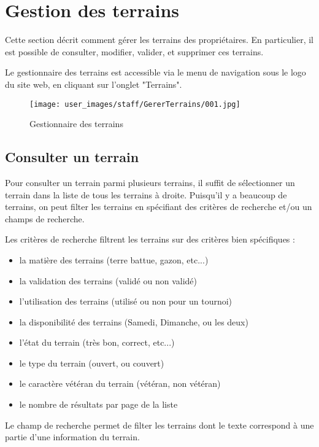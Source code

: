 \section{Gestion des terrains}

Cette section décrit comment gérer les terrains des propriétaires. En particulier, il est possible de consulter, modifier, valider, et supprimer ces terrains. \newline

Le gestionnaire des terrains est accessible via le menu de navigation sous le logo du site web, en cliquant sur l'onglet "Terrains".

\begin{figure}[H]
\centering
\texttt{[image: user\_images/staff/GererTerrains/001.jpg]}
\caption{Gestionnaire des terrains}
\end{figure}

\subsection{Consulter un terrain}

Pour consulter un terrain parmi plusieurs terrains, il suffit de sélectionner un terrain dans la liste de tous les terrains à droite. Puisqu'il y a beaucoup de terrains, on peut filter les terrains en spécifiant des critères de recherche et/ou un champs de recherche.\newline

Les critères de recherche filtrent les terrains sur des critères bien spécifiques :

\begin{itemize}
\item la matière des terrains (terre battue, gazon, etc...)
\item la validation des terrains (validé ou non validé)
\item l'utilisation des terrains (utilisé ou non pour un tournoi)
\item la disponibilité des terrains (Samedi, Dimanche, ou les deux)
\item l'état du terrain (très bon, correct, etc...)
\item le type du terrain (ouvert, ou couvert)
\item le caractère vétéran du terrain (vétéran, non vétéran)
\item le nombre de résultats par page de la liste
\end{itemize}

Le champ de recherche permet de filter les terrains dont le texte correspond à une partie d'une information du terrain.\newline

